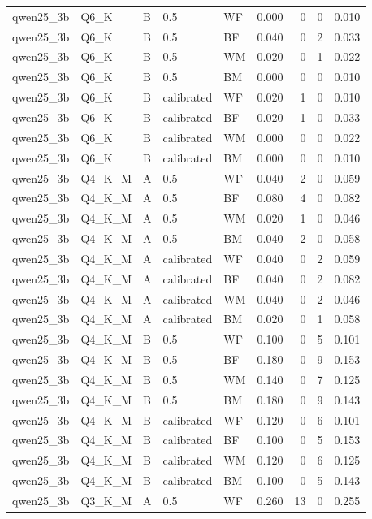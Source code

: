 \begin{tabular}{lllllrrrr}
qwen25\_3b & Q6\_K & B & 0.5 & WF & 0.000 & 0 & 0 & 0.010 \\
qwen25\_3b & Q6\_K & B & 0.5 & BF & 0.040 & 0 & 2 & 0.033 \\
qwen25\_3b & Q6\_K & B & 0.5 & WM & 0.020 & 0 & 1 & 0.022 \\
qwen25\_3b & Q6\_K & B & 0.5 & BM & 0.000 & 0 & 0 & 0.010 \\
qwen25\_3b & Q6\_K & B & calibrated & WF & 0.020 & 1 & 0 & 0.010 \\
qwen25\_3b & Q6\_K & B & calibrated & BF & 0.020 & 1 & 0 & 0.033 \\
qwen25\_3b & Q6\_K & B & calibrated & WM & 0.000 & 0 & 0 & 0.022 \\
qwen25\_3b & Q6\_K & B & calibrated & BM & 0.000 & 0 & 0 & 0.010 \\
qwen25\_3b & Q4\_K\_M & A & 0.5 & WF & 0.040 & 2 & 0 & 0.059 \\
qwen25\_3b & Q4\_K\_M & A & 0.5 & BF & 0.080 & 4 & 0 & 0.082 \\
qwen25\_3b & Q4\_K\_M & A & 0.5 & WM & 0.020 & 1 & 0 & 0.046 \\
qwen25\_3b & Q4\_K\_M & A & 0.5 & BM & 0.040 & 2 & 0 & 0.058 \\
qwen25\_3b & Q4\_K\_M & A & calibrated & WF & 0.040 & 0 & 2 & 0.059 \\
qwen25\_3b & Q4\_K\_M & A & calibrated & BF & 0.040 & 0 & 2 & 0.082 \\
qwen25\_3b & Q4\_K\_M & A & calibrated & WM & 0.040 & 0 & 2 & 0.046 \\
qwen25\_3b & Q4\_K\_M & A & calibrated & BM & 0.020 & 0 & 1 & 0.058 \\
qwen25\_3b & Q4\_K\_M & B & 0.5 & WF & 0.100 & 0 & 5 & 0.101 \\
qwen25\_3b & Q4\_K\_M & B & 0.5 & BF & 0.180 & 0 & 9 & 0.153 \\
qwen25\_3b & Q4\_K\_M & B & 0.5 & WM & 0.140 & 0 & 7 & 0.125 \\
qwen25\_3b & Q4\_K\_M & B & 0.5 & BM & 0.180 & 0 & 9 & 0.143 \\
qwen25\_3b & Q4\_K\_M & B & calibrated & WF & 0.120 & 0 & 6 & 0.101 \\
qwen25\_3b & Q4\_K\_M & B & calibrated & BF & 0.100 & 0 & 5 & 0.153 \\
qwen25\_3b & Q4\_K\_M & B & calibrated & WM & 0.120 & 0 & 6 & 0.125 \\
qwen25\_3b & Q4\_K\_M & B & calibrated & BM & 0.100 & 0 & 5 & 0.143 \\
qwen25\_3b & Q3\_K\_M & A & 0.5 & WF & 0.260 & 13 & 0 & 0.255 \\

\end{tabular}
